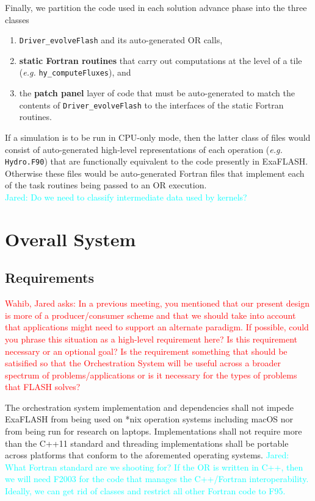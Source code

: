 \documentclass{article}
\newcommand{\FlashOfTheFuture}{ExaFLASH\xspace}
\newcommand{\Jared}[1]          {\textcolor{cyan}{Jared: #1}}
\newcommand{\WahibQfromJO}[1]   {\textcolor{red}{Wahib, Jared asks: #1}}
\newcommand{\shortOR}   {OR\xspace}
\newcommand{\OR}        {\shortOR}
\newcommand{\taskroutines}       {task routines\xspace}
\begin{document}
Finally, we partition the code used in each solution advance phase into the three classes
\begin{enumerate}
\item{\texttt{Driver\_evolveFlash} and its auto-generated \OR calls,}
\item{\textbf{static Fortran routines} that carry out computations at the
level of a tile (\textit{e.g.} \texttt{hy\_computeFluxes}), and}
\item{the \textbf{patch panel} layer of code that must be auto-generated to
match the contents of \texttt{Driver\_evolveFlash} to the interfaces of the
static Fortran routines.}
\end{enumerate}
If a simulation is to be run in CPU-only mode, then the latter class of files
would consist of auto-generated high-level representations of each operation
(\textit{e.g.} \texttt{Hydro.F90}) that are functionally equivalent to the code presently
in \FlashOfTheFuture.  Otherwise these files would be auto-generated Fortran files that
implement each of the \taskroutines being passed to an \OR execution.\\

\Jared{Do we need to classify intermediate data used by kernels?}

\section{Overall System}
\subsection{Requirements}

\WahibQfromJO{In a previous meeting, you mentioned that our present design is
more of a producer/consumer scheme and that we should take into account that
applications might need to support an alternate paradigm.  If possible, could
you phrase this situation as a high-level requirement here?  Is this requirement
necessary or an optional goal?  Is the requirement something that should be
satisified so that the Orchestration System will be useful across a broader
spectrum of problems/applications or is it necessary for the types of problems
that FLASH solves?}

\begin{req}
The orchestration system implementation and dependencies shall not impede \FlashOfTheFuture
from being used on *nix operation systems including macOS nor from being run for
research on laptops.  Implementations shall not require more than the C++11
standard and threading implementations shall be portable across platforms that
conform to the aforemented operating systems.  \Jared{What
Fortran standard are we shooting for?  If the \OR is written in C++, then we
will need F2003 for the code that manages the C++/Fortran interoperability.
Ideally, we can get rid of classes and restrict all other Fortran code to F95.}
\end{req}
\end{document}
